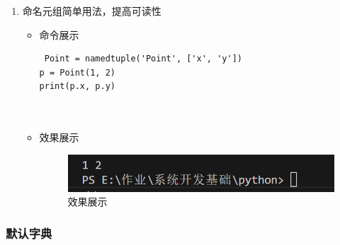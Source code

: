 \documentclass[UTF8]{ctexart}
\begin{document}
\begin{enumerate}
  \item 命名元组简单用法，提高可读性
  \begin{itemize}
  \item 命令展示
  \begin{verbatim}
 Point = namedtuple('Point', ['x', 'y'])
p = Point(1, 2)
print(p.x, p.y)

    
  \end{verbatim}

  \item 效果展示
  \begin{figure}[H]
    \centering
    \includegraphics[width=\textwidth]{2114} %
    \caption{效果展示}
  
  \end{figure}
\end{itemize}
\end{enumerate}







\subsubsection{默认字典}
\end{document}
